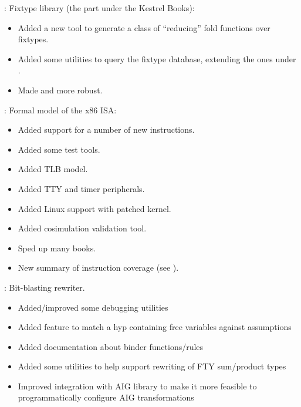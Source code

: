 
\begin{frame}

\implibtitle

:
Fixtype library (the part under the Kestrel Books):
\begin{itemize}
\item Added a new  tool
      to generate a class of ``reducing'' fold functions over fixtypes.
\item Added some utilities to query the fixtype database,
      extending the ones under .
\item Made  and  more robust.
\end{itemize}

\end{frame}


\begin{frame}

\implibtitle

:
Formal model of the x86 ISA:
\begin{itemize}
\item Added support for a number of new instructions.
\item Added some test tools.
\item Added TLB model.
\item Added TTY and timer peripherals.
\item Added Linux support with patched kernel.
\item Added cosimulation validation tool.
\item Sped up many books.
\item New summary of instruction coverage (see ).
\end{itemize}

\end{frame}


\begin{frame}

\implibtitle

:
Bit-blasting rewriter.
\begin{itemize}
\item Added/improved some debugging utilities
\item Added feature to match a hyp containing free variables against assumptions
\item Added documentation about binder functions/rules
\item Added some utilities to help support rewriting of FTY sum/product types
\item Improved integration with AIG library to make it more feasible
  to programmatically configure AIG transformations
\end{itemize}

\end{frame}


